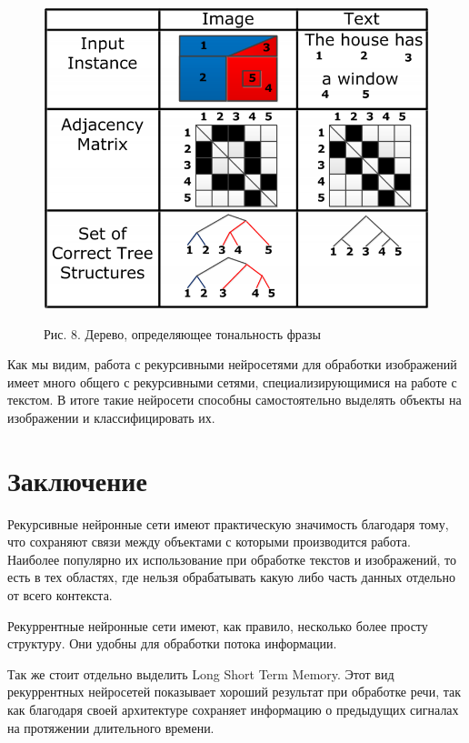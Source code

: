 \documentclass[14pt]{article}
\begin{document}
\begin{figure}[!h]
    \centering
        \includegraphics[width=14cm]{Fig9.png}
    \parbox[t][1.2cm][c]{16cm}{
        \centering
        Рис. 8. Дерево, определяющее тональность фразы
    }
\end{figure}


Как мы видим, работа с рекурсивными нейросетями для обработки изображений имеет много общего с рекурсивными сетями, специализирующимися на работе с текстом. В итоге такие нейросети способны самостоятельно выделять объекты на изображении и классифицировать их.


\pagebreak

\section{Заключение}
Рекурсивные нейронные сети имеют практическую значимость благодаря тому, что сохраняют связи между объектами с которыми производится работа. Наиболее популярно их использование при обработке текстов и изображений, то есть в тех областях, где нельзя обрабатывать какую либо часть данных отдельно от всего контекста.


Рекуррентные нейронные сети имеют, как правило, несколько более просту структуру. Они удобны для обработки потока информации.


Так же стоит отдельно выделить Long Short Term Memory. Этот вид рекуррентных нейросетей показывает хороший результат при обработке речи, так как благодаря своей архитектуре сохраняет информацию о предыдущих сигналах на протяжении длительного времени.
\end{document}
